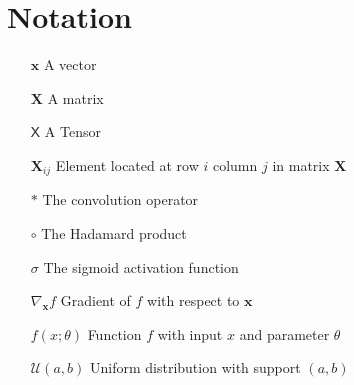 \documentclass[./main.tex]{subfiles}
\begin{document}
\section*{Notation}
\begin{itemize}[leftmargin=2.0cm,labelsep=0.5cm]
    \item[$\bm{x}$] A vector
    \item[$\bm{X}$] A matrix
    \item[$\mathsf{X}$] A Tensor 
    \item[$\bm{X}_{ij}$] Element located at row $i$ column $j$ in matrix $\bm{X}$
    \item[$*$] The convolution operator
    \item[$\circ$] The Hadamard product  
    \item[$\sigma$] The sigmoid activation function 
    \item[$\nabla_{\bm{x}} f$] Gradient of $f$ with respect to $\bm{x}$
    \item[$f(x; \theta)$] Function $f$ with input $x$ and parameter $\theta$
    \item[$\mathcal{U}(a, b)$] Uniform distribution with support $(a, b)$
\end{itemize}
\end{document}
